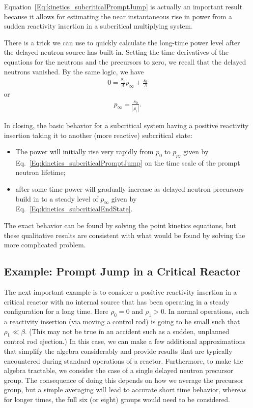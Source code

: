 Equation~\eqref{Eq:kinetics_subcriticalPromptJump} is actually an important result because it allows for estimating the near instantaneous rise in power from a sudden reactivity insertion in a subcritical multiplying system. 

There is a trick we can use to quickly calculate the long-time power level after the delayed neutron source has built in. Setting the time derivatives of the equations for the neutrons and the precursors to zero, we recall that the delayed neutrons vanished. By the same logic, we have
\begin{align}
  0 = \frac{\rho_1}{\Lambda} p_\infty + \frac{s_0}{\Lambda}  \nonumber
\end{align}
or
\begin{align}
  p_\infty = \frac{s_0}{|\rho_1|} . \label{Eq:kinetics_subcriticalEndState}
\end{align}

In closing, the basic behavior for a subcritical system having a positive reactivity insertion taking it to another (more reactive) subcritical state:
\begin{itemize}
  \item The power will initially rise very rapidly from $p_0$ to $p_{pj}$ given by Eq.~\eqref{Eq:kinetics_subcriticalPromptJump} on the time scale of the prompt neutron lifetime;
  \item after some time power will gradually increase as delayed neutron precursors build in to a steady level of $p_\infty$ given by Eq.~\eqref{Eq:kinetics_subcriticalEndState}.
\end{itemize}
The exact behavior can be found by solving the point kinetics equations, but these qualitative results are consistent with what would be found by solving the more complicated problem.

\subsection{Example: Prompt Jump in a Critical Reactor}

The next important example is to consider a positive reactivity insertion in a critical reactor with no internal source that has been operating in a steady configuration for a long time. Here $\rho_0 = 0$ and $\rho_1 > 0$. In normal operations, such a reactivity insertion (via moving a control rod) is going to be small such that $\rho_1 \ll \beta$. (This may not be true in an accident such as a sudden, unplanned control rod ejection.) In this case, we can make a few additional approximations that simplify the algebra considerably and provide results that are typically encountered during standard operations of a reactor. Furthermore, to make the algebra tractable, we consider the case of a single delayed neutron precursor group. The consequence of doing this depends on how we average the precursor group, but a simple averaging will lead to accurate short time behavior, whereas for longer times, the full six (or eight) groups would need to be considered.

